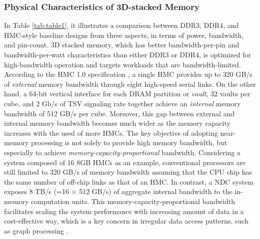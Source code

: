 \documentclass[letterpaper, 11pt, conference, margin=1in]{ieeeconf}   %
\begin{document}
\subsubsection{\bf Physical Characteristics of 3D-stacked Memory}
In Table \ref{tab:table1}, it illustrates a comparison between DDR3, DDR4, and HMC-style baseline designs from three aspects, in terms of power, bandwidth, and pin-count. 3D stacked memory, which has better bandwidth-per-pin and bandwidth-per-watt characteristics than either DDR3 or DDR4, is optimized for high-bandwidth operation and targets workloads that are bandwidth-limited. According to the HMC 1.0 specification \cite{HMC-1.0}, a single HMC provides up to 320 GB/s of \textit{external} memory bandwidth through eight high-speed serial links. On the other hand, a 64-bit vertical interface for each DRAM partition or \textit{vault}, 32 vaults per cube, and 2 Gb/s of TSV signaling rate \cite{Pugsley2014NDCAT} together achieve an \textit{internal} memory bandwidth of 512 GB/s per cube. Moreover, this gap between external and internal memory bandwidth becomes much wider as the memory capacity increases with the used of more HMCs. The key objective of adopting near-memory processing is not solely to provide high memory bandwidth, but especially to achieve \textit{memory-capacity-proportional} bandwidth. Considering a system composed of 16 8GB HMCs as an example, conventional processors are still limited to 320 GB/s of memory bandwidth assuming that the CPU chip has the same number of off-chip links as that of an HMC. In contrast, a NDC system exposes 8 TB/s (=16 $\times$ 512 GB/s) of aggregate internal bandwidth to the in-memory computation units. This memory-capacity-proportional bandwidth facilitates scaling the system performance with increasing amount of data in a cost-effective way, which is a key concern in irregular data access patterns, such as graph processing \cite{Ahn:2015:SPA:2749469.2750386}.\\

\end{document}
